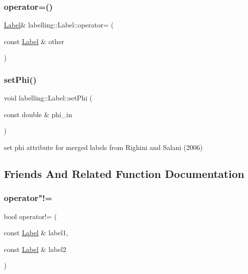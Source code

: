 \subsubsection{\texorpdfstring{operator=()}{operator=()}}
{\footnotesize\ttfamily \hyperlink{classlabelling_1_1Label}{Label}\& labelling\+::\+Label\+::operator= (\begin{DoxyParamCaption}\item[{const \hyperlink{classlabelling_1_1Label}{Label} \&}]{other }\end{DoxyParamCaption})\hspace{0.3cm}{\ttfamily [default]}}

\mbox{\label{classlabelling_1_1Label_afffea46e29dc7074edd10470c5dfeb87}} 
\subsubsection{\texorpdfstring{set\+Phi()}{setPhi()}}
{\footnotesize\ttfamily void labelling\+::\+Label\+::set\+Phi (\begin{DoxyParamCaption}\item[{const double \&}]{phi\+\_\+in }\end{DoxyParamCaption})\hspace{0.3cm}{\ttfamily [inline]}}



set phi attribute for merged labels from Righini and Salani (2006) 



\subsection{Friends And Related Function Documentation}
\mbox{\label{classlabelling_1_1Label_a48813c4c8ca8174edcdf9cf34358b442}} 
\subsubsection{\texorpdfstring{operator"!=}{operator!=}}
{\footnotesize\ttfamily bool operator!= (\begin{DoxyParamCaption}\item[{const \hyperlink{classlabelling_1_1Label}{Label} \&}]{label1,  }\item[{const \hyperlink{classlabelling_1_1Label}{Label} \&}]{label2 }\end{DoxyParamCaption})\hspace{0.3cm}{\ttfamily [friend]}}

